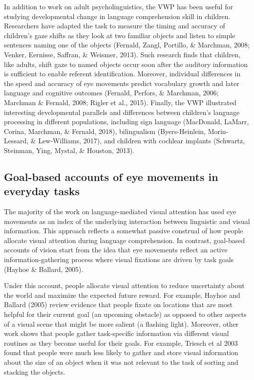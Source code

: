 \documentclass[english,floatsintext,man]{apa6}
\theoremstyle{definition}
\theoremstyle{definition}
\theoremstyle{definition}
\theoremstyle{remark}
\begin{document}
In addition to work on adult psycholinguistics, the VWP has been useful
for studying developmental change in language comprehension skill in
children. Researchers have adapted the task to measure the timing and
accuracy of children's gaze shifts as they look at two familiar objects
and listen to simple sentences naming one of the objects (Fernald,
Zangl, Portillo, \& Marchman, 2008; Venker, Eernisse, Saffran, \&
Weismer, 2013). Such research finds that children, like adults, shift
gaze to named objects occur soon after the auditory information is
sufficient to enable referent identification. Moreover, individual
differences in the speed and accuracy of eye movements predict
vocabulary growth and later language and cognitive outcomes (Fernald,
Perfors, \& Marchman, 2006; Marchman \& Fernald, 2008; Rigler et al.,
2015). Finally, the VWP illustrated interesting developmental parallels
and differences between children's language processing in different
populations, including sign language (MacDonald, LaMarr, Corina,
Marchman, \& Fernald, 2018), bilingualism (Byers-Heinlein,
Morin-Lessard, \& Lew-Williams, 2017), and children with cochlear
implants (Schwartz, Steinman, Ying, Mystal, \& Houston, 2013).

\hypertarget{goal-based-accounts-of-eye-movements-in-everyday-tasks}{%
\subsection{Goal-based accounts of eye movements in everyday
tasks}\label{goal-based-accounts-of-eye-movements-in-everyday-tasks}}

The majority of the work on language-mediated visual attention has used
eye movements as an index of the underlying interaction between
linguistic and visual information. This approach reflects a somewhat
passive construal of how people allocate visual attention during
language comprehension. In contrast, goal-based accounts of vision start
from the idea that eye movements reflect an active information-gathering
process where visual fixations are driven by task goals (Hayhoe \&
Ballard, 2005).

Under this account, people allocate visual attention to reduce
uncertainty about the world and maximize the expected future reward. For
example, Hayhoe and Ballard (2005) review evidence that people fixate on
locations that are most helpful for their current goal (an upcoming
obstacle) as opposed to other aspects of a visual scene that might be
more salient (a flashing light). Moreover, other work shows that people
gather task-specific information via different visual routines as they
become useful for their goals. For example, Triesch et al 2003 found
that people were much less likely to gather and store visual information
about the size of an object when it was not relevant to the task of
sorting and stacking the objects.
\end{document}

